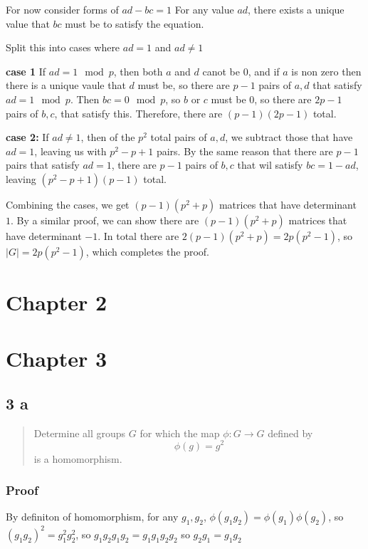 \documentclass[11pt]{article}
\begin{document}
For now consider forms of \(ad - bc = 1\)
For any value \(ad\), there exists a unique value that \(bc\) must be to
satisfy the equation.

Split this into cases where \(ad = 1\) and \(ad \ne 1\)

\textbf{case 1}
If \(ad = 1 \mod p\), then both \(a\) and \(d\) canot be \(0\), and if \(a\) is non zero
then there is a unique vaule that \(d\) must be, so there are \(p - 1\) pairs of \(a, d\)
that satisfy \(ad = 1 \mod p\).  Then \(bc = 0 \mod p\), so \(b\) or \(c\) must be \(0\), so
there are \(2p - 1\) pairs of \(b, c\), that satisfy this.  Therefore, there are
\((p - 1)(2p - 1)\) total.

\textbf{case 2:}
If \(ad \ne 1\), then of the \(p^2\) total pairs of \(a, d\), we subtract those that have
\(ad = 1\), leaving us with \(p^2 - p + 1\) pairs.  By the same reason that
there are \(p - 1\) pairs that satisfy \(ad = 1\), there are \(p -1\) pairs of \(b, c\)
that wil satisfy \(bc = 1 - ad\), leaving \((p^2 - p + 1)(p - 1)\) total.

Combining the cases, we get \((p - 1)(p^2 + p)\) matrices that have determinant \(1\).
By a similar proof, we can show there are \((p - 1)(p^2 + p)\) matrices that have
determinant \(-1\).  In total there are \(2(p-1)(p^2 + p) = 2p(p^2 - 1)\), so
\(|G| = 2p(p^2 - 1)\), which completes the proof.
\section{Chapter 2}
\label{sec:org28ea054}
\section{Chapter 3}
\label{sec:orgb103aa8}
\subsection{3 a}
\label{sec:org694b732}

\begin{quote}
Determine all groups \(G\) for which the map \(\phi : G \rightarrow G\) defined by
\begin{equation}
\label{eq:1}
\phi(g) = g^{2}
\end{equation}
is a homomorphism.
\end{quote}
\subsubsection{Proof}
\label{sec:orgedf9916}
By definiton of homomorphism, for any \(g_1, g_2\), \(\phi(g_1 g_2) =
\phi(g_{1}) \phi(g_{2})\), so \((g_1 g_{2})^{2}  =
g_{1}^{2} g_{2}^{2}\), so \(g_1 g_2 g_1 g_2 = g_1 g_1 g_2 g_2\) so \(g_2 g_1 =
g_1 g_2\)
\end{document}
